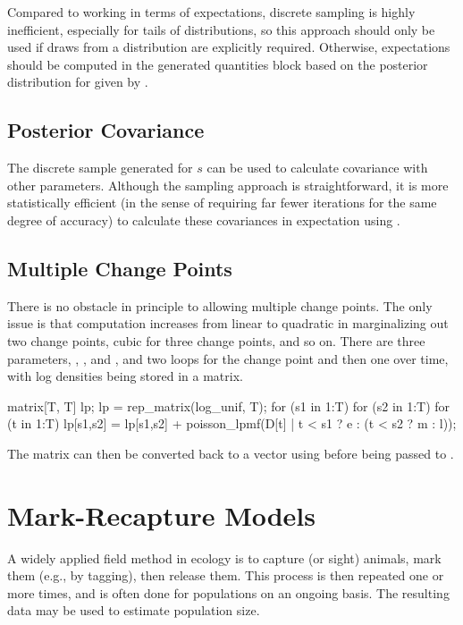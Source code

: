 Compared to working in terms of expectations, discrete sampling is
highly inefficient, especially for tails of distributions, so this
approach should only be used if draws from a distribution are
explicitly required.   Otherwise, expectations should be computed in
the generated quantities block based on the posterior distribution for
 given by .


\subsection{Posterior Covariance}

The discrete sample generated for $s$ can be used to calculate
covariance with other parameters.  Although the sampling approach is
straightforward, it is more statistically efficient (in the sense of
requiring far fewer iterations for the same degree of accuracy) to
calculate these covariances in expectation using .


\subsection{Multiple Change Points}

There is no obstacle in principle to allowing multiple change points.
The only issue is that computation increases from linear to quadratic
in marginalizing out two change points, cubic for three change points,
and so on.  There are three parameters, , , and
, and two loops for the change point and then one over time,
with log densities being stored in a matrix.
%
\begin{stancode}
matrix[T, T] lp;
lp = rep_matrix(log_unif, T);
for (s1 in 1:T)
  for (s2 in 1:T)
    for (t in 1:T)
      lp[s1,s2] = lp[s1,s2] 
        + poisson_lpmf(D[t] | t < s1 ? e : (t < s2 ? m : l));
\end{stancode}
%
The matrix can then be converted back to a vector using
 before being passed to .

\section{Mark-Recapture Models}

A widely applied field method in ecology is to capture (or sight)
animals, mark them (e.g., by tagging), then release them.  This
process is then repeated one or more times, and is often done for
populations on an ongoing basis.  The resulting data may be used to
estimate population size.

